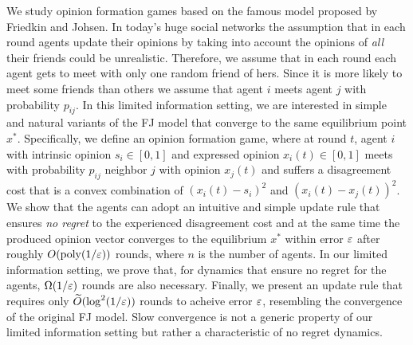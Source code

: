 We study opinion formation games based on the famous model proposed by Friedkin
and Johsen.  In today's huge social networks the assumption that in each round
agents update their opinions by taking into account the opinions of \emph{all}
their friends could be unrealistic. Therefore, we assume that in each round
each agent gets to meet with only one random friend of hers. Since it is more
likely to meet some friends than others we assume that agent $i$ meets agent
$j$ with probability $p_{ij}$.  In this limited information setting, we are
interested in simple and natural variants of the FJ model that converge to the
same equilibrium point $x^*$.  Specifically, we define an opinion formation
game, where at round $t$, agent $i$ with intrinsic opinion $s_i\in[0,1]$ and
expressed opinion $x_i(t) \in[0,1]$ meets with probability $p_{ij}$ neighbor
$j$ with opinion $x_j(t)$ and suffers a disagreement cost that is a convex
combination of $(x_i(t) - s_i)^2$ and $(x_i(t) - x_j(t))^2$.  We show that the
agents can adopt an intuitive and simple update rule that ensures
\emph{no regret} to the experienced disagreement cost and at the same time the
produced opinion vector converges to the equilibrium $x^*$ within error $\varepsilon$
after roughly $O(\mathrm{poly}(1/\varepsilon))$ rounds, where $n$ is the number of
agents.  In our limited information setting, we prove that, for dynamics that
ensure no regret for the agents, $\Omega(1/\varepsilon)$ rounds are also necessary.
Finally, we present an update rule that requires only
$\widetilde{O}(\log^2(1/\varepsilon))$ rounds to acheive error $\varepsilon$,
resembling the convergence of the original FJ model.  Slow convergence is not
a generic property of our limited information setting but rather a
characteristic of no regret dynamics.
